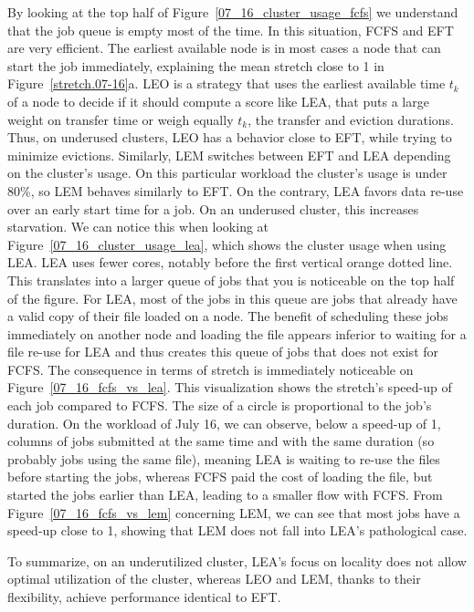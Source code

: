 \documentclass[conference,10pt]{IEEEtran}
\begin{document}
By looking at the top half of Figure~\ref{07_16_cluster_usage_fcfs}
we understand that the job queue is empty most of the time.
In this situation, FCFS and EFT are very efficient. The earliest available node is in
most cases a node that can start the job immediately, explaining the mean stretch close to 1 in Figure~\ref{stretch.07-16}a.
LEO is a strategy that uses the earliest available time $t_k$ of a node to decide if it should compute a score like LEA,
that puts a large weight on transfer time or weigh equally $t_k$, the transfer and eviction durations. 
Thus, on underused clusters, LEO has a behavior close to EFT, while trying to minimize evictions.
Similarly, LEM switches between EFT and LEA depending on the cluster's usage.
On this particular workload the cluster's usage is under 80\%, so LEM behaves similarly to EFT.
On the contrary, LEA favors data re-use over an early start time for a job.
On an underused cluster, this increases starvation.
We can notice this when looking at
Figure~\ref{07_16_cluster_usage_lea}, which shows the cluster usage when using LEA.
LEA uses fewer cores, notably before the first vertical orange dotted line. 
This translates into a larger queue of jobs that you is noticeable on the top half of the figure.
For LEA, most of the jobs in this queue are jobs that already have a valid copy of their file loaded on a node. 
The benefit of scheduling these jobs immediately on another node and loading the file appears
inferior to waiting for a file re-use for LEA and thus creates this queue of jobs that does not exist for FCFS. 
The consequence in terms of stretch is immediately noticeable on Figure~\ref{07_16_fcfs_vs_lea}.
This visualization shows the stretch's speed-up of each job compared to FCFS.
The size of a circle is proportional to the job's duration.
On the workload of July 16, we can observe, below a speed-up of 1, columns of jobs submitted at the same time and
with the same duration (so probably jobs using the same file),
meaning LEA is waiting to re-use the files before starting the jobs,
whereas FCFS paid the cost of loading the file, but started the jobs
earlier than LEA, leading to a 
smaller flow with FCFS.
From Figure~\ref{07_16_fcfs_vs_lem} concerning LEM, we can see that most jobs have a speed-up close to 1, showing 
that LEM does not fall into LEA's pathological case.

To summarize, on an underutilized cluster, LEA's focus on locality
does not allow optimal utilization of the cluster, whereas LEO and LEM, thanks
to their flexibility,
achieve performance identical to EFT.
\end{document}

